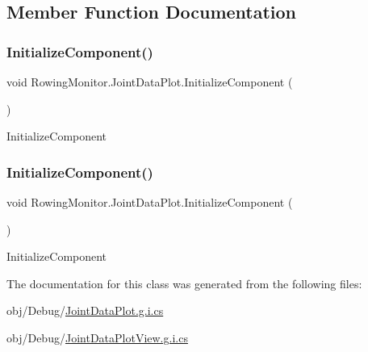 \subsection{Member Function Documentation}
\mbox{\label{class_rowing_monitor_1_1_joint_data_plot_a8cfc1167162972427c71ab8247c1d19d}} 
\subsubsection{\texorpdfstring{Initialize\+Component()}{InitializeComponent()}\hspace{0.1cm}{\footnotesize\ttfamily [1/2]}}
{\footnotesize\ttfamily void Rowing\+Monitor.\+Joint\+Data\+Plot.\+Initialize\+Component (\begin{DoxyParamCaption}{ }\end{DoxyParamCaption})}



Initialize\+Component 

\mbox{\label{class_rowing_monitor_1_1_joint_data_plot_a8cfc1167162972427c71ab8247c1d19d}} 
\subsubsection{\texorpdfstring{Initialize\+Component()}{InitializeComponent()}\hspace{0.1cm}{\footnotesize\ttfamily [2/2]}}
{\footnotesize\ttfamily void Rowing\+Monitor.\+Joint\+Data\+Plot.\+Initialize\+Component (\begin{DoxyParamCaption}{ }\end{DoxyParamCaption})}



Initialize\+Component 



The documentation for this class was generated from the following files\+:\begin{DoxyCompactItemize}
\item 
obj/\+Debug/\hyperlink{_joint_data_plot_8g_8i_8cs}{Joint\+Data\+Plot.\+g.\+i.\+cs}\item 
obj/\+Debug/\hyperlink{_debug_2_joint_data_plot_view_8g_8i_8cs}{Joint\+Data\+Plot\+View.\+g.\+i.\+cs}\end{DoxyCompactItemize}
